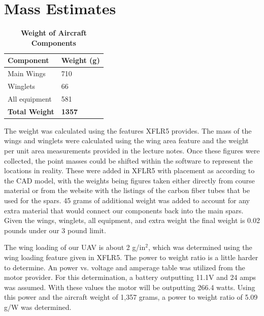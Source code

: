 \section{Mass Estimates}

    \begin{table}[H]
        \begin{center}
        \caption{\textbf{Weight of Aircraft Components}} \label{table:Weights}
        \begin{tabular}{|p{1in}|p{1in}|} %
        \hline
            \textbf{Component} & \textbf{Weight (g)} \\ \hline
            Main Wings & 710 \\ \hline
            Winglets & 66 \\ \hline
            All equipment & 581 \\ \hline
            \textbf{Total Weight} & \textbf{1357} \\ \hline
        \end{tabular}
        \end{center}
    \end{table}

    The weight was calculated using the features XFLR5 provides. The mass of the wings and winglets were calculated using the wing area feature and the weight per unit area measurements provided in the lecture notes. Once these figures were collected, the point masses could be shifted within the software to represent the locations in reality. These were added in XFLR5 with placement as according to the CAD model, with the weights being figures taken either directly from course material or from the website with the listings of the carbon fiber tubes that be used for the spars. 45 grams of additional weight was added to account for any extra material that would connect our components back into the main spars. Given the wings, winglets, all equipment, and extra weight the final weight is 0.02 pounds under our 3 pound limit. 
    
    The wing loading of our UAV is about 2 g/in$^2$, which was determined using the wing loading feature given in XFLR5. The power to weight ratio is a little harder to determine. An power vs. voltage and amperage table was utilized from the motor provider. For this determination, a battery outputting 11.1V and 24 amps was assumed. With these values the motor will be outputting 266.4 watts. Using this power and the aircraft weight of 1,357 grams, a power to weight ratio of 5.09 g/W was determined.



